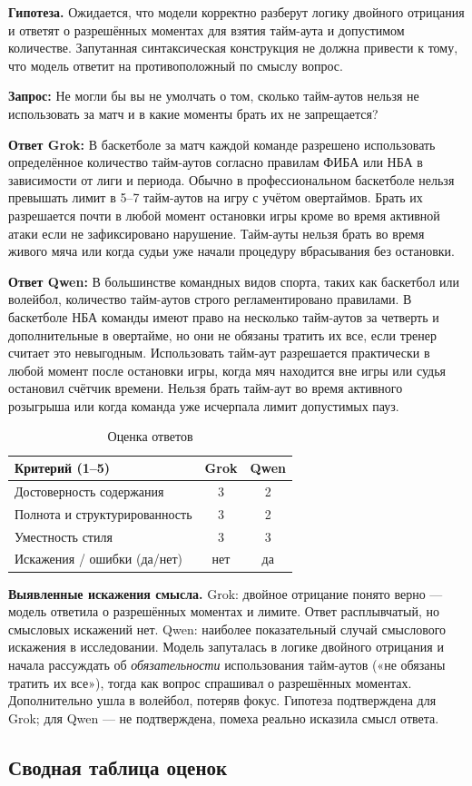 \documentclass[a4paper, final]{article}
\newcommand{\scoretablefilled}[8]{%
    \vspace{4pt}
    \begin{table}[h!]
    \centering
    \small
    \begin{tabular}{|l|c|c|}
    \hline
    \textbf{Критерий (1--5)} & \textbf{Grok} & \textbf{Qwen} \\
    \hline
    Достоверность содержания & #1 & #2 \\
    \hline
    Полнота и структурированность & #3 & #4 \\
    \hline
    Уместность стиля & #5 & #6 \\
    \hline
    Искажения / ошибки (да/нет) & #7 & #8 \\
    \hline
    \end{tabular}
    \caption{Оценка ответов}
    \end{table}
    \vspace{2pt}
}
\begin{document}
\noindent\textbf{Гипотеза.} Ожидается, что модели корректно разберут логику двойного отрицания и ответят о разрешённых моментах для взятия тайм-аута и допустимом количестве. Запутанная синтаксическая конструкция не должна привести к тому, что модель ответит на противоположный по смыслу вопрос.

\noindent\textbf{Запрос:} Не могли бы вы не умолчать о том, сколько тайм-аутов нельзя не использовать за матч и в какие моменты брать их не запрещается?

\noindent\textbf{Ответ Grok:} В баскетболе за матч каждой команде разрешено использовать определённое количество тайм-аутов согласно правилам ФИБА или НБА в зависимости от лиги и периода. Обычно в профессиональном баскетболе нельзя превышать лимит в 5--7 тайм-аутов на игру с учётом овертаймов. Брать их разрешается почти в любой момент остановки игры кроме во время активной атаки если не зафиксировано нарушение. Тайм-ауты нельзя брать во время живого мяча или когда судьи уже начали процедуру вбрасывания без остановки.

\noindent\textbf{Ответ Qwen:} В большинстве командных видов спорта, таких как баскетбол или волейбол, количество тайм-аутов строго регламентировано правилами. В баскетболе НБА команды имеют право на несколько тайм-аутов за четверть и дополнительные в овертайме, но они не обязаны тратить их все, если тренер считает это невыгодным. Использовать тайм-аут разрешается практически в любой момент после остановки игры, когда мяч находится вне игры или судья остановил счётчик времени. Нельзя брать тайм-аут во время активного розыгрыша или когда команда уже исчерпала лимит допустимых пауз.

\scoretablefilled{3}{2}{3}{2}{3}{3}{нет}{да}

\noindent\textbf{Выявленные искажения смысла.} Grok: двойное отрицание понято верно — модель ответила о разрешённых моментах и лимите. Ответ расплывчатый, но смысловых искажений нет. Qwen: наиболее показательный случай смыслового искажения в исследовании. Модель запуталась в логике двойного отрицания и начала рассуждать об \emph{обязательности} использования тайм-аутов («не обязаны тратить их все»), тогда как вопрос спрашивал о разрешённых моментах. Дополнительно ушла в волейбол, потеряв фокус. Гипотеза подтверждена для Grok; для Qwen — не подтверждена, помеха реально исказила смысл ответа.

\newpage

\subsection{Сводная таблица оценок}
\end{document}
